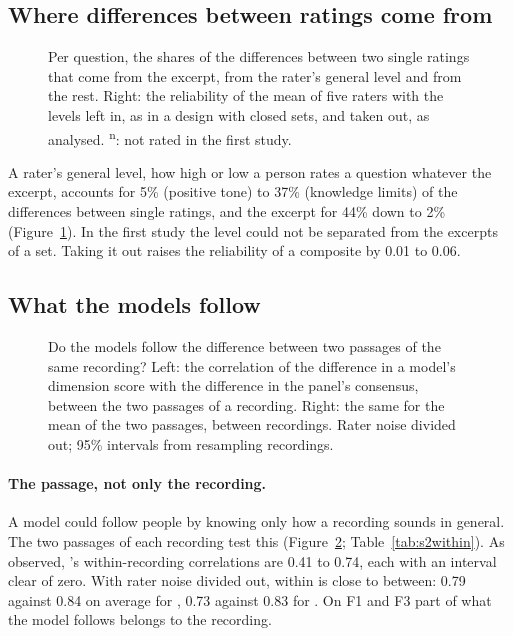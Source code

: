 \subsection{Where differences between ratings come from}\label{sec:sources}

\begin{figure}[!htb]\centering

\caption{Per question, the shares of the differences between two single ratings that come from the excerpt, from
the rater's general level and from the rest. Right: the reliability of the mean of five raters with the levels
left in, as in a design with closed sets, and taken out, as analysed. \textsuperscript{n}: not rated in the
first study.}\label{fig:s2sources}
\end{figure}

A rater's general level, how high or low a person rates a question whatever the excerpt, accounts for 5\%
(positive tone) to 37\% (knowledge limits) of the differences between single ratings, and the excerpt for 44\%
down to 2\% (Figure~\ref{fig:s2sources}). In the first study the level could not be separated from the excerpts
of a set. Taking it out raises the reliability of a composite by 0.01 to 0.06.

\subsection{What the models follow}\label{sec:follow}

\begin{figure}[!htb]\centering

\caption{Do the models follow the difference between two passages of the same recording? Left: the correlation
of the difference in a model's dimension score with the difference in the panel's consensus, between the two
passages of a recording. Right: the same for the mean of the two passages, between recordings. Rater noise
divided out; 95\% intervals from resampling recordings.}\label{fig:s2within}
\end{figure}

\paragraph{The passage, not only the recording.} A model could follow people by knowing only how a recording
sounds in general. The two passages of each recording test this (Figure~\ref{fig:s2within};
Table~\ref{tab:s2within}). As observed, \jev{}'s within-recording correlations are 0.41 to 0.74, each with an
interval clear of zero. With rater noise divided out, within is close to between: 0.79 against 0.84 on average
for \jev{}, 0.73 against 0.83 for \drex{}. On F1 and F3 part of what the model follows belongs to the
recording.

